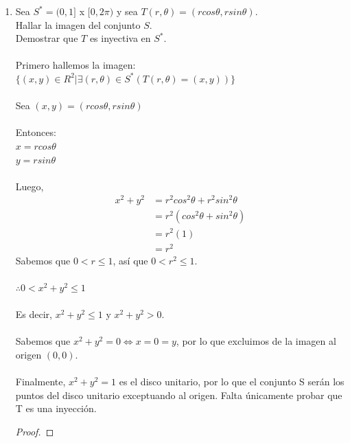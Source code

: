 \documentclass[10pt,letterpaper,fleqn]{article}
\begin{document}
    \begin{enumerate}

        \item Sea $S^* = (0,1]$ x $[0, 2\pi)$ y sea $T(r, \theta) = (r cos \theta, r sin \theta)$.\\
        Hallar la imagen del conjunto $S$.\\
        Demostrar que $T$ es inyectiva en $S^*$.\\\\
        Primero hallemos la imagen:\\
        $\lbrace (x, y) \in R^2 | \exists (r, \theta) \in S^* (T(r, \theta) = (x,y)) \rbrace$\\\\
        Sea $(x, y) = (r cos \theta, r sin \theta)$\\\\
        Entonces:\\
        $x = r cos \theta$\\
        $y = r sin \theta$\\\\
        Luego, 
        \begin{equation*}
        \begin{split}
        x^2 + y^2 & = r^2 cos^2 \theta + r^2 sin^2 \theta \\
        & = r^2 (cos^2 \theta + sin^2 \theta) \\
        & = r^2 (1) \\
        & = r^2  
        \end{split}
        \end{equation*}
        Sabemos que $0 < r \leq 1$, así que $0 < r^2 \leq 1$.\\\\
        $\therefore 0 < x^2 + y^2 \leq 1$\\\\
        Es decir, $x^2 + y^2 \leq 1$ y $x^2 + y^2 > 0$.\\\\
        Sabemos que $x^2 + y^2 = 0 \Leftrightarrow x = 0 = y$, por lo que excluimos de la imagen al origen $(0, 0)$.\\\\
        Finalmente, $x^2 + y^2 = 1$ es el disco unitario, por lo que el conjunto S serán los puntos del disco unitario exceptuando al origen. Falta únicamente probar que T es una inyección.\\
        \begin{proof}

\end{proof}
\end{enumerate}
\end{document}
